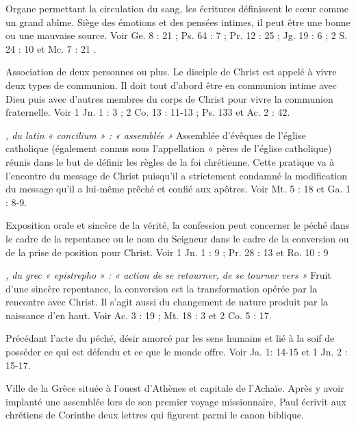 \begin{multicols}{2}
\textit{}\newline
Organe permettant la circulation du sang, les écritures définissent le cœur comme un grand abîme. Siège des émotions et des pensées intimes, il peut être une bonne ou une mauvaise source. Voir Ge. 8 : 21 ; Ps. 64 : 7 ; Pr. 12 : 25 ; Jg. 19 : 6 ; 2 S. 24 : 10 et Mc. 7 : 21 .

\textit{}\newline
Association de deux personnes ou plus. Le disciple de Christ est appelé à vivre deux types de communion. Il doit tout d’abord être en communion intime avec Dieu puis avec d’autres membres du corps de Christ pour vivre la communion fraternelle. Voir 1 Jn. 1 : 3 ; 2 Co. 13 : 11-13 ; Ps. 133 et Ac. 2 : 42.

\textit{, du latin « concilium » : « assemblée »}\newline
Assemblée d'évêques de l'église catholique (également connus sous l’appellation « pères de l’église catholique) réunis dans le but de définir les règles de la foi chrétienne. Cette pratique va à l’encontre du message de Christ puisqu’il a strictement condamné la modification du message qu’il a lui-même prêché et confié aux apôtres. Voir Mt. 5 : 18 et Ga. 1 : 8-9.

\textit{}\newline
Exposition orale et sincère de la vérité, la confession peut concerner le péché dans le cadre de la repentance ou le nom du Seigneur dans le cadre de la conversion ou de la prise de position pour Christ. Voir 1 Jn. 1 : 9 ; Pr. 28 : 13 et Ro. 10 : 9

\textit{, du grec « epistrepho » : « action de se retourner, de se tourner vers »}\newline
Fruit d’une sincère repentance, la conversion est la transformation opérée par la rencontre avec Christ. Il s’agit aussi du changement de nature produit par la naissance d’en haut. Voir Ac. 3 : 19 ; Mt. 18 : 3 et 2 Co. 5 : 17.

\textit{}\newline
Précédant l’acte du péché, désir amorcé par les sens humains et lié à la soif de posséder ce qui est défendu et ce que le monde offre. Voir Ja. 1: 14-15 et 1 Jn. 2 : 15-17.

\textit{}\newline
Ville de la Grèce située à l'ouest d'Athènes et capitale de l'Achaïe. Après y avoir implanté une assemblée lors de son premier voyage missionnaire, Paul écrivit aux chrétiens de Corinthe deux lettres qui figurent parmi le canon biblique.


\end{multicols}
